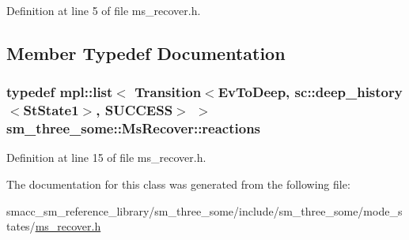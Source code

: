 Definition at line 5 of file ms\+\_\+recover.\+h.



\subsection{Member Typedef Documentation}
\subsubsection[{\texorpdfstring{reactions}{reactions}}]{\setlength{\rightskip}{0pt plus 5cm}typedef mpl\+::list$<$ Transition$<${\bf Ev\+To\+Deep}, sc\+::deep\+\_\+history$<${\bf St\+State1}$>$, {\bf S\+U\+C\+C\+E\+SS}$>$ $>$ {\bf sm\+\_\+three\+\_\+some\+::\+Ms\+Recover\+::reactions}}\hypertarget{classsm__three__some_1_1MsRecover_aedc7f6fc4e95c1567e3262381b4bafce}{}\label{classsm__three__some_1_1MsRecover_aedc7f6fc4e95c1567e3262381b4bafce}


Definition at line 15 of file ms\+\_\+recover.\+h.



The documentation for this class was generated from the following file\+:\begin{DoxyCompactItemize}
\item 
smacc\+\_\+sm\+\_\+reference\+\_\+library/sm\+\_\+three\+\_\+some/include/sm\+\_\+three\+\_\+some/mode\+\_\+states/\hyperlink{ms__recover_8h}{ms\+\_\+recover.\+h}\end{DoxyCompactItemize}
